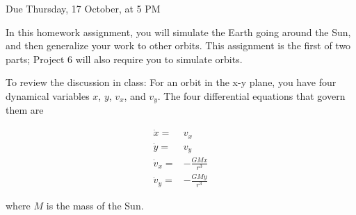 \documentclass[12pt]{article}
\begin{document}
\Large
\centerline{}
\centerline{Due Thursday, 17 October, at 5 PM}
\normalsize

In this homework assignment, you will simulate the Earth going around the Sun,
and then generalize your work to other orbits. This assignment is the first of two parts; Project 6 will
also require you to simulate orbits.

To review the discussion in class: 
For an orbit in the x-y plane, you have four dynamical variables $x$, $y$,
$v_x$, and $v_y$. The four differential equations that govern them are

\begin{align}
\dot x =& v_x\\
\dot y =& v_y\\
\dot v_x =& -\frac{GMx}{r^3} \\
\dot v_y =& -\frac{GMy}{r^3} 
\end{align}

where $M$ is the mass of the Sun.
\end{document}
